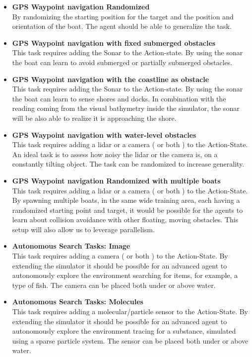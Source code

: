 \begin{itemize}
    \item {\bf GPS Waypoint navigation Randomized } \\
    By randomizing the starting position for the target and the position and orientation of the boat. The agent should be able to generalize the task.

    \item {\bf GPS Waypoint navigation with fixed submerged obstacles } \\
    This task requires adding the Sonar to the Action-state. By using the sonar the boat can learn to avoid submerged or partially submerged obstacles.
    
    
    \item {\bf GPS Waypoint navigation with the coastline as obstacle } \\
    This task requires adding the Sonar to the Action-state. By using the sonar the boat can learn to sense shores and docks.
    In combination with the reading coming from the visual bathymetry inside the simulator, the sonar will be also able to realize it is approaching the shore.
    
    
    \item {\bf GPS Waypoint navigation with water-level obstacles } \\
    This task requires adding a lidar or a camera ( or both ) to the Action-State. An ideal task is to assess how noisy the lidar or the camera is, on a constantly tilting object. The task can be randomized to increase generality.
    
    
    \item {\bf GPS Waypoint navigation Randomized with multiple boats } \\
    This task requires adding a lidar or a camera ( or both ) to the Action-State. By spawning multiple boats, in the same wide training area, each having a randomized starting point and target, it would be possible for the agents to learn about collision avoidance with other floating, moving obstacles. This setup will also allow us to leverage parallelism.
    
    \item {\bf Autonomous Search Tasks: Image } \\
    This task requires adding a camera ( or both ) to the Action-State.
    By extending the simulator it should be possible for an advanced agent to autonomously explore the environment searching for items, for example, a type of fish. The camera can be placed both under or above water. 
    
    \item {\bf Autonomous Search Tasks: Molecules } \\
    This task requires adding a molecular/particle sensor to the Action-State.
    By extending the simulator it should be possible for an advanced agent to autonomously explore the environment tracing for a substance, simulated using a sparse particle system. The sensor can be placed both under or above water.


\end{itemize}


